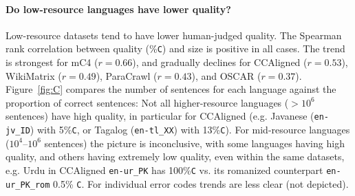 \paragraph{Do low-resource languages have lower quality?}
Low-resource datasets tend to have lower human-judged quality.
The Spearman rank correlation between quality (\%\texttt{C}) and size is positive in all cases. The trend is strongest for mC4 ($r=0.66$), %
and gradually declines for CCAligned ($r=0.53$), %
WikiMatrix ($r=0.49$), %
ParaCrawl ($r=0.43$), %
and OSCAR ($r=0.37$). %
Figure~\ref{fig:C} compares the number of sentences for each language against the proportion of correct sentences: %
Not all higher-resource languages ($>10^6$ sentences) have high quality, in particular for CCAligned (e.g. Javanese (\texttt{en\nobreakdash-jv\_ID}) with 5\%\texttt{C}, or Tagalog (\texttt{en\nobreakdash-tl\_XX}) with 13\%\texttt{C}). For mid-resource languages ($10^4$\nobreakdash--$10^6$ sentences) the picture is inconclusive, with some languages having high quality, and others having extremely low quality, even within the same datasets, e.g. Urdu in CCAligned \texttt{en-ur\_PK} has 100\%\texttt{C} vs. its romanized counterpart \texttt{en\nobreakdash-ur\_PK\_rom} 0.5\% \texttt{C}.
For individual error codes trends are less clear (not depicted).

